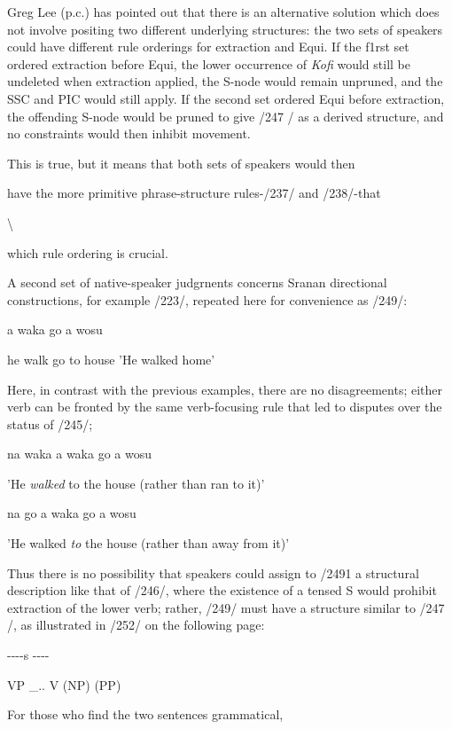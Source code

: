 Greg Lee (p.c.) has pointed out that there is an alternative solution which does not involve positing two different underlying structures: the two sets of speakers could have different rule orderings for extraction and Equi. If the f1rst set ordered extraction before Equi, the lower occurrence of \textit{Kofi} would still be undeleted when extraction applied, the S-node would remain unpruned, and the SSC and PIC would still apply. If the second set ordered Equi before ex\-traction, the offending S-node would be pruned to give /247 / as a derived structure, and no constraints would then inhibit movement.

This is true, but it means that both sets of speakers would then

have the more primitive phrase-structure rules-/237/ and /238/-that

{\textbackslash}

which rule ordering is crucial.

A second set of native-speaker judgrnents concerns Sranan directional constructions, for example /223/, repeated here for conveni\-ence as /249/:

\ea\label{ex:249}
 a waka go a wosu
\glt
\z

he walk go to house 'He walked home'

Here, in contrast with the previous examples, there are no disagree\-ments; either verb can be fronted by the same verb-focusing rule that led to disputes over the status of /245/;

\ea\label{ex:250}
 na waka a waka go a wosu
\glt
\z

'He \textit{walked} to the house (rather than ran to it)'

\ea\label{ex:251}
 na go a waka go a wosu
\glt
\z

'He walked \textit{to} the house (rather than away from it)'

Thus there is no possibility that speakers could assign to /2491 a struc\-tural description like that of /246/, where the existence of a tensed S would prohibit extraction of the lower verb; rather, /249/ must have a structure similar to /247 /, as illustrated in /252/ on the following page:


\ea\label{ex:252}
 {}-{}-{}-{}-s {}-{}-{}-{}-
\glt
\z

\ea\label{ex:259}
 VP \_.. V (NP) (PP)
\glt
\z


For those who find the two sentences grammatical,

